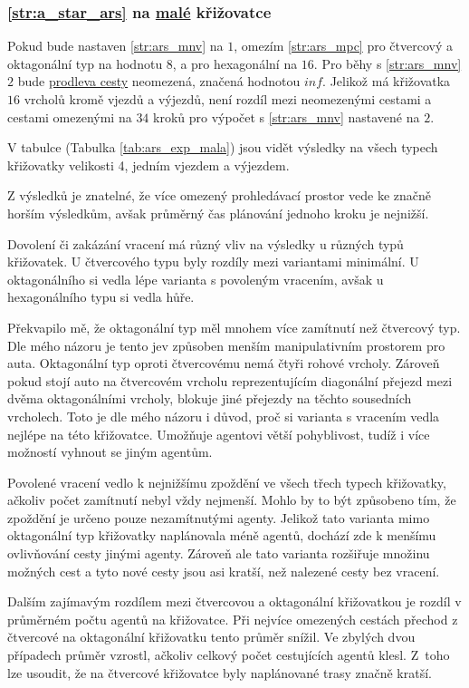 \subsubsection{\ref{str:a_star_ars} na \hyperref[par:data_mala]{malé} křižovatce}
\label{subsubsec:exp_ars_mala_krizovatka}

Pokud bude nastaven \ref{str:ars_mnv} na $1$, omezím \ref{str:ars_mpc}
pro čtvercový a oktagonální typ na hodnotu $8$, a pro hexagonální na $16$.
Pro běhy s \ref{str:ars_mnv} $2$ bude \hyperref[par:ars_mpc]{prodleva cesty} neomezená, značená hodnotou $inf$.
Jelikož má křižovatka $16$ vrcholů kromě vjezdů a výjezdů, není rozdíl mezi neomezenými cestami a
cestami omezenými na $34$ kroků pro výpočet s \ref{str:ars_mnv} nastavené na $2$.

V tabulce (Tabulka \ref{tab:ars_exp_mala}) jsou vidět výsledky na všech typech křižovatky
velikosti 4, jedním vjezdem a výjezdem.


Z výsledků je znatelné, že více omezený prohledávací prostor vede ke značně horším výsledkům,
avšak průměrný čas plánování jednoho kroku je nejnižší.

Dovolení či zakázání vracení má různý vliv na výsledky u různých typů křižovatek.
U čtvercového typu byly rozdíly mezi variantami minimální.
U oktagonálního si vedla lépe varianta s povoleným vracením, avšak u hexagonálního typu si vedla hůře.

Překvapilo mě, že oktagonální typ měl mnohem více zamítnutí než čtvercový typ.
Dle mého názoru je tento jev způsoben menším manipulativním prostorem pro auta.
Oktagonální typ oproti čtvercovému nemá čtyři rohové vrcholy.
Zároveň pokud stojí auto na čtvercovém vrcholu reprezentujícím diagonální přejezd mezi dvěma oktagonálními vrcholy,
blokuje jiné přejezdy na těchto sousedních vrcholech. %
Toto je dle mého názoru i důvod, proč si varianta s vracením vedla nejlépe na této křižovatce.
Umožňuje agentovi větší pohyblivost, tudíž i více možností vyhnout se jiným agentům.

Povolené vracení vedlo k nejnižšímu zpoždění ve všech třech typech křižovatky,
ačkoliv počet zamítnutí nebyl vždy nejmenší.
Mohlo by to být způsobeno tím, že zpoždění je určeno pouze nezamítnutými agenty.
Jelikož tato varianta mimo oktagonální typ křižovatky naplánovala méně agentů,
dochází zde k menšímu ovlivňování cesty jinými agenty.
Zároveň ale tato varianta rozšiřuje množinu možných cest a tyto nové cesty jsou asi kratší,
než nalezené cesty bez vracení.

Dalším zajímavým rozdílem mezi čtvercovou a oktagonální křižovatkou je rozdíl v průměrném počtu agentů na křižovatce.
Při nejvíce omezených cestách přechod z čtvercové na oktagonální křižovatku tento průměr snížil.
Ve zbylých dvou případech průměr vzrostl, ačkoliv celkový počet cestujících agentů klesl.
Z~toho lze usoudit, že na čtvercové křižovatce byly naplánované trasy značně kratší.

